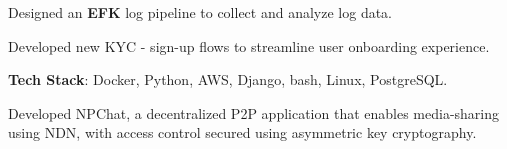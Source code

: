 \documentclass[letterpaper]{deedy-resume} %
\begin{document}
\begin{minipage}[t]{0.66\textwidth}
\begin{tightitemize}
\item Designed an \textbf{EFK} log pipeline to collect and analyze log data.
\item Developed new KYC - sign-up flows to streamline user onboarding experience.
\item \textbf{Tech Stack}: Docker, Python, AWS, Django, bash, Linux, PostgreSQL.
\end{tightitemize}

\sectionspace %




\begin{tightitemize}
\item Developed NPChat, a decentralized P2P application that enables media-sharing using NDN, with access control secured using asymmetric key cryptography.
\end{tightitemize}


\end{minipage}
\end{document}
